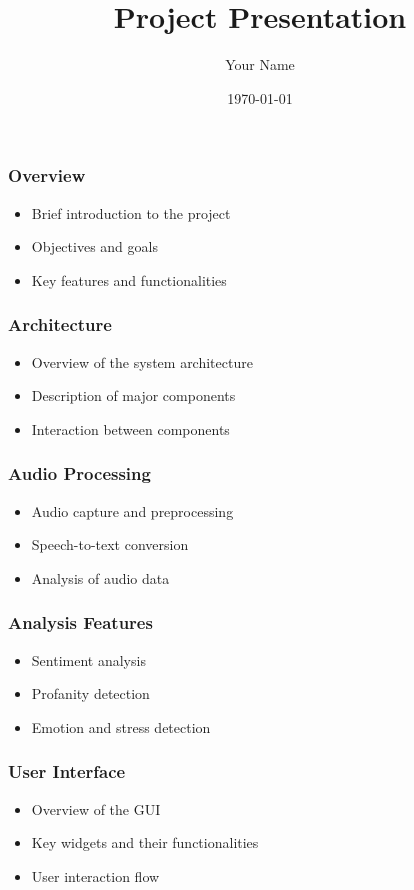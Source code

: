 \documentclass{beamer}
\title{Project Presentation}
\author{Your Name}
\date{\today}
\begin{document}
\frame{\titlepage}

\begin{frame}
    \frametitle{Overview}
    \begin{itemize}
        \item Brief introduction to the project
        \item Objectives and goals
        \item Key features and functionalities
    \end{itemize}
\end{frame}

\begin{frame}
    \frametitle{Architecture}
    \begin{itemize}
        \item Overview of the system architecture
        \item Description of major components
        \item Interaction between components
    \end{itemize}
\end{frame}

\begin{frame}
    \frametitle{Audio Processing}
    \begin{itemize}
        \item Audio capture and preprocessing
        \item Speech-to-text conversion
        \item Analysis of audio data
    \end{itemize}
\end{frame}

\begin{frame}
    \frametitle{Analysis Features}
    \begin{itemize}
        \item Sentiment analysis
        \item Profanity detection
        \item Emotion and stress detection
    \end{itemize}
\end{frame}

\begin{frame}
    \frametitle{User Interface}
    \begin{itemize}
        \item Overview of the GUI
        \item Key widgets and their functionalities
        \item User interaction flow
    \end{itemize}
\end{frame}
\end{document}
